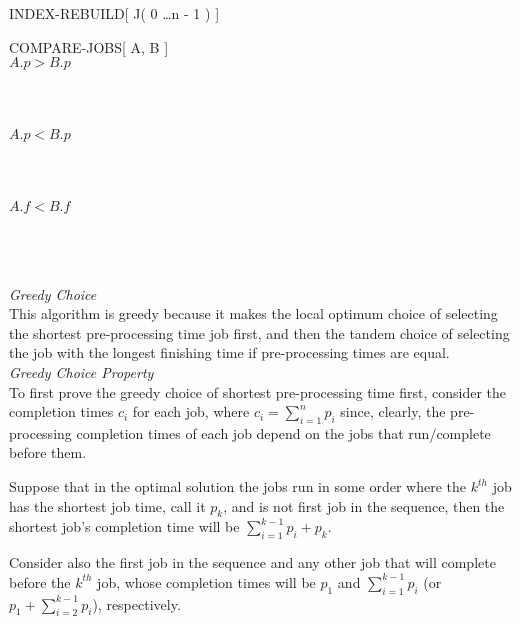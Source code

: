 \documentclass[11pts]{article}
\begin{document}
\begin{enumerate}
\begin{algorithm}{INDEX-REBUILD}[ J( 0 \dots n - 1 ) ]{
   }
\end{algorithm}


\begin{algorithm}{COMPARE-JOBS}[ A, B ]{
   }
   \\
  \qif $A.p > B.p$ \\
  \qthen \\
    \qreturn \qtrue \\
  \qelse \\
    \qif $A.p < B.p$ \\
    \qthen \\
      \qreturn \qfalse \\
    \qelse \\
      \qif $A.f < B.f$ \\
      \qthen \\
        \qreturn \qfalse \\
      \qelse \\
        \qreturn \qtrue
      \qfi
    \qfi
  \qfi

\end{algorithm}

  \textit{Greedy Choice} \\
  This algorithm is greedy because it makes the local optimum choice of
  selecting the shortest pre-processing time job first, and then the
  tandem choice of selecting the job with the longest finishing time
  if pre-processing times are equal. \\
  
  \textit{Greedy Choice Property} \\
  To first prove the greedy choice of shortest pre-processing time first,
  consider the completion times $c_i$ for each job, where
  $c_i = \sum_{i=1}^{n}{p_i}$ since,
  clearly, the pre-processing completion times of each job depend on the
  jobs that run/complete before them.

  Suppose that in the optimal solution the jobs run in some
  order where the $k^{th}$ job has the shortest
  job time, call it $p_k$, and is not first job in the sequence, then the
  shortest job's completion
  time will be $\sum_{i=1}^{k-1}{p_{i}} + p_k$.

  Consider also the first job in the sequence and any other job that will
  complete before the $k^{th}$ job, whose completion times will be $p_1$
  and $\sum_{i=1}^{k-1}{p_{i}}$ (or $p_1 + \sum_{i=2}^{k-1}{p_{i}}$),
  respectively.


\end{enumerate}
\end{document}
